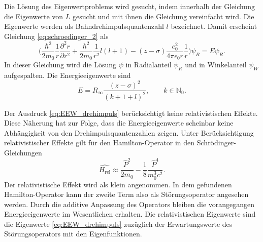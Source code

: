 Die Lösung des Eigenwertproblems wird gesucht, indem innerhalb der Gleichung die Eigenwerte von $L$ gesucht und mit ihnen die Gleichung vereinfacht wird.
Die Eigenwerte werden als Bahndrehimpulsquantenzahl $l$ bezeichnet.
Damit erscheint Gleichung \eqref{eq:schroedinger_2} als
\begin{equation}
	\biggl(\frac{\hbar^2}{2m_0}\frac{1}{r}\frac{\partial^2 r}{\partial r^2}+\frac{\hbar^2}{2m_0}\frac{1}{r^2} l(l+1)-(z-\sigma)\frac{e_0^2}{4\pi\epsilon_0 r}\frac{1}{r}\biggr)\psi_R=E\psi_R.
	\label{eq:EEW_drehimpuls_flasche}
\end{equation}
In dieser Gleichung wird die Lösung $\psi$ in Radialanteil $\psi_R$ und in Winkelanteil $\psi_W$ aufgespalten. 
Die Energieeigenwerte sind
\begin{equation}
	E=R_\infty\frac{(z-\sigma)^2}{(k+1+l)^2}, \qquad k\in\mathbb{N_0}.
	\label{eq:EEW_drehimpuls}
\end{equation}


Der Ausdruck \eqref{eq:EEW_drehimpuls} berücksichtigt keine relativistischen Effekte.
Diese Näherung hat zur Folge, dass die Energieeigenwerte scheinbar keine Abhängigkeit von den Drehimpulsquantenzahlen zeigen.
Unter Berücksichtigung relativistischer Effekte gilt für den Hamilton-Operator in den Schrödinger-Gleichungen
\begin{equation}
	\hat{H_\text{rel}}\approx\frac{\hat{P}^2}{2m_0}-\frac{1}{8}\frac{\hat{P}^4}{m_0^3 c^2}.
	\label{eq:relativerhamilton}
\end{equation}
Der relativistische Effekt wird als klein angenommen. In dem gefundenen Hamilton-Operator kann der zweite Term also als Störungsoperator angesehen werden.
Durch die additive Anpassung des Operators bleiben die vorangegangen Energieeigenwerte im Wesentlichen erhalten.
Die relativistischen Eigenwerte sind die Eigenwerte \eqref{eq:EEW_drehimpuls} zuzüglich der Erwartungswerte des Störungsoperators mit den Eigenfunktionen.

